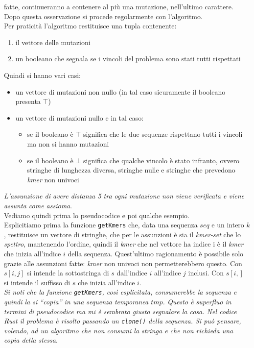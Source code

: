 \documentclass[a4paper,12pt, oneside]{book}
\begin{document}
fatte, continueranno a contenere al più una mutazione, nell'ultimo
carattere. Dopo questa osservazione 
si procede regolarmente con l'algoritmo.\\
Per praticità l'algoritmo restituisce una tupla contenente:
\begin{enumerate}
  \item il vettore delle mutazioni
  \item un booleano che segnala se i vincoli del problema sono stati tutti
  rispettati 
\end{enumerate}
Quindi si hanno vari casi:
\begin{itemize}
  \item un vettore di mutazioni non nullo (in tal caso sicuramente il booleano
  presenta $\top$)
  \item un vettore di mutazioni nullo e in tal caso:
  \begin{itemize}
    \item se il booleano è $\top$ significa che le due sequenze rispettano tutti
    i vincoli ma non si hanno mutazioni
    \item se il booleano è $\bot$ significa che qualche vincolo è stato
    infranto, ovvero stringhe di lunghezza diversa, stringhe nulle e stringhe
    che prevedono \textit{kmer} non univoci
  \end{itemize}
\end{itemize}
\textit{L'assunzione di avere distanza 5 tra ogni mutazione non viene verificata
  e viene assunta come assioma}.\\
Vediamo quindi prima lo pseudocodice e poi qualche esempio.\\
Esplicitiamo prima la funzione \texttt{getKmers} che, data una sequenza $seq$ e
un intero $k$, restituisce un vettore di stringhe, che per le assunzioni è sia
il \textit{kmer-set} che lo \textit{spettro}, mantenendo l'ordine, quindi il
\textit{kmer} che nel vettore ha indice i è il \textit{kmer} che inizia
all'indice $i$ della sequenza. Quest'ultimo ragionamento è possibile solo grazie
alle assunzioni fatte: \textit{kmer} non univoci non permetterebbero questo. Con
$s[i,j]$ si intende la sottostringa di $s$ dall'indice $i$ all'indice $j$
inclusi. Con $s[i,]$ si intende il suffisso di $s$ che inizia all'indice $i$.\\
\textit{Si noti che la funzione \texttt{getKmers}, così esplicitata,
  consumerebbe la sequenza e quindi la si ``copia'' in una sequenza temporanea
  $tmp$. Questo è
  superfluo in termini di pseudocodice ma mi è sembrato giusto segnalare la
  cosa. Nel codice Rust il problema è risolto passando un \texttt{clone()} della
  sequenza. Si può pensare, volendo, ad un algoritmo che non consumi la stringa
  e che non richieda una copia della stessa}.
\end{document}
